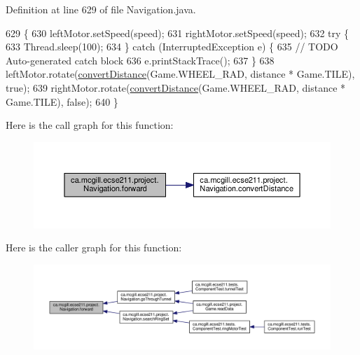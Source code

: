 Definition at line 629 of file Navigation.\+java.


\begin{DoxyCode}
629                                                   \{
630     leftMotor.setSpeed(speed);
631     rightMotor.setSpeed(speed);
632     \textcolor{keywordflow}{try} \{
633       Thread.sleep(100);
634     \} \textcolor{keywordflow}{catch} (InterruptedException e) \{
635       \textcolor{comment}{// TODO Auto-generated catch block}
636       e.printStackTrace();
637     \}
638     leftMotor.rotate(\hyperlink{classca_1_1mcgill_1_1ecse211_1_1project_1_1_navigation_ac9e260bcd619ffa4820d7d0de7ea1c12}{convertDistance}(Game.WHEEL\_RAD, distance * Game.TILE), \textcolor{keyword}{true});
639     rightMotor.rotate(\hyperlink{classca_1_1mcgill_1_1ecse211_1_1project_1_1_navigation_ac9e260bcd619ffa4820d7d0de7ea1c12}{convertDistance}(Game.WHEEL\_RAD, distance * Game.TILE), \textcolor{keyword}{false});
640   \}
\end{DoxyCode}
Here is the call graph for this function\+:
\nopagebreak
\begin{figure}[H]
\begin{center}
\leavevmode
\includegraphics[width=350pt]{classca_1_1mcgill_1_1ecse211_1_1project_1_1_navigation_a7c66610c5b7496ddb35d342ab2cd3f08_cgraph}
\end{center}
\end{figure}
Here is the caller graph for this function\+:
\nopagebreak
\begin{figure}[H]
\begin{center}
\leavevmode
\includegraphics[width=350pt]{classca_1_1mcgill_1_1ecse211_1_1project_1_1_navigation_a7c66610c5b7496ddb35d342ab2cd3f08_icgraph}
\end{center}
\end{figure}
\mbox{\label{classca_1_1mcgill_1_1ecse211_1_1project_1_1_navigation_a4b52e605d3ea2f9bcd9481ae2c69ba39}} 
